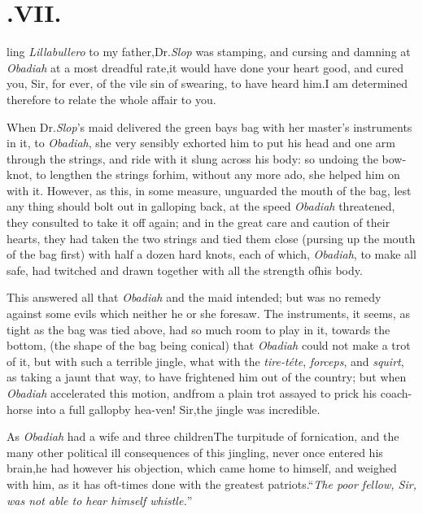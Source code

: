 \documentclass{article}
\begin{document}
\section{.\quad  VII.}

 \break
ling \textit{Lillabullero} to my father,\tsk\break Dr.\@ \textit{Slop}
was stamping, and cursing and damning at \textit{Obadiah} at a most
dreadful rate,\tsh it would have done your heart good, and
cured you, Sir, for ever, of the vile sin of swearing, to have heard
him.\tsk I am determined therefore to relate the whole affair to
you.

When Dr.\@ \textit{Slop}’s maid delivered the green bays bag
with her master’s instruments in it, to \textit{Obadiah}, she
very sensibly exhorted him to put his head and one arm through
the strings, and ride with it slung across his body: so undoing
the
bow-knot, to lengthen the strings for\break him, without any
more ado, she helped him on with it. However, as this, in some
measure, unguarded the mouth of the bag, lest any thing should
bolt out in galloping back, at the speed \textit{Obadiah}
threatened, they consulted to take it off again; and in the
great care and caution of their hearts, they had taken the two
strings and tied them close (pursing up the mouth of the bag
first) with half a dozen hard knots, each of which,
\textit{Obadiah}, to make all safe, had twitched and drawn
together with all the strength of\break his body.

This answered all that \textit{Obadiah} and the maid intended;
but was no remedy against some evils which neither he or she
foresaw.  The instruments, it seems, as tight as the bag was
tied above, had 
so much room to play in it, towards the bottom, (the shape of
the bag being conical) that \textit{Obadiah} could not make a
trot of it, but with such a terrible jingle, what with the
\textit{tire-téte}, \textit{forceps}, and \textit{squirt}, as
 taking a jaunt
that way, to have frightened him out of the country; but when
\textit{Obadiah} accelerated this motion, and\break from a plain trot
assayed to prick his coach-horse into a full gallop\tsk by
hea-\break ven! Sir,\tsk the jingle was incredible.

As \textit{Obadiah} had a wife and three children\tsk The
turpitude of fornication, and the many other political ill
consequences of this jingling, never once entered his
brain,\tsk he had however his objection, which came home
to himself, and weigh\-ed with him, as it has oft-times done with
the greatest patriots.\tsk “\textit{The poor fel\-low, Sir, was
not able to hear himself whistle.}”
\end{document}
